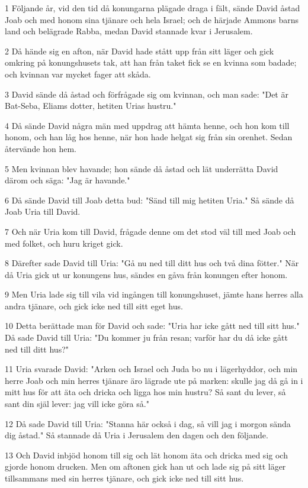 \par 1 Följande år, vid den tid då konungarna plägade draga i fält, sände David åstad Joab och med honom sina tjänare och hela Israel; och de härjade Ammons barns land och belägrade Rabba, medan David stannade kvar i Jerusalem.
\par 2 Då hände sig en afton, när David hade stått upp från sitt läger och gick omkring på konungshusets tak, att han från taket fick se en kvinna som badade; och kvinnan var mycket fager att skåda.
\par 3 David sände då åstad och förfrågade sig om kvinnan, och man sade: "Det är Bat-Seba, Eliams dotter, hetiten Urias hustru."
\par 4 Då sände David några män med uppdrag att hämta henne, och hon kom till honom, och han låg hos henne, när hon hade helgat sig från sin orenhet. Sedan återvände hon hem.
\par 5 Men kvinnan blev havande; hon sände då åstad och lät underrätta David därom och säga: "Jag är havande."
\par 6 Då sände David till Joab detta bud: "Sänd till mig hetiten Uria." Så sände då Joab Uria till David.
\par 7 Och när Uria kom till David, frågade denne om det stod väl till med Joab och med folket, och huru kriget gick.
\par 8 Därefter sade David till Uria: "Gå nu ned till ditt hus och två dina fötter." När då Uria gick ut ur konungens hus, sändes en gåva från konungen efter honom.
\par 9 Men Uria lade sig till vila vid ingången till konungshuset, jämte hans herres alla andra tjänare, och gick icke ned till sitt eget hus.
\par 10 Detta berättade man för David och sade: "Uria har icke gått ned till sitt hus." Då sade David till Uria: "Du kommer ju från resan; varför har du då icke gått ned till ditt hus?"
\par 11 Uria svarade David: "Arken och Israel och Juda bo nu i lägerhyddor, och min herre Joab och min herres tjänare äro lägrade ute på marken: skulle jag då gå in i mitt hus för att äta och dricka och ligga hos min hustru? Så sant du lever, så sant din själ lever: jag vill icke göra så."
\par 12 Då sade David till Uria: "Stanna här också i dag, så vill jag i morgon sända dig åstad." Så stannade då Uria i Jerusalem den dagen och den följande.
\par 13 Och David inbjöd honom till sig och lät honom äta och dricka med sig och gjorde honom drucken. Men om aftonen gick han ut och lade sig på sitt läger tillsammans med sin herres tjänare, och gick icke ned till sitt hus.
